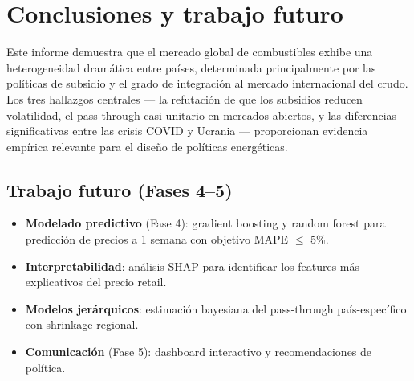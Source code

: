 \documentclass[stu, 12pt, a4paper, biblatex, donotrepeattitle]{apa7}
\begin{document}
\section{Conclusiones y trabajo futuro}

Este informe demuestra que el mercado global de combustibles exhibe una heterogeneidad dramática entre países, determinada principalmente por las políticas de subsidio y el grado de integración al mercado internacional del crudo. Los tres hallazgos centrales --- la refutación de que los subsidios reducen volatilidad, el pass-through casi unitario en mercados abiertos, y las diferencias significativas entre las crisis COVID y Ucrania --- proporcionan evidencia empírica relevante para el diseño de políticas energéticas.

\subsection{Trabajo futuro (Fases 4--5)}

\begin{itemize}
  \item \textbf{Modelado predictivo} (Fase 4): gradient boosting y random forest para predicción de precios a 1 semana con objetivo MAPE $\leq$ 5\%.
  \item \textbf{Interpretabilidad}: análisis SHAP para identificar los features más explicativos del precio retail.
  \item \textbf{Modelos jerárquicos}: estimación bayesiana del pass-through país-específico con shrinkage regional.
  \item \textbf{Comunicación} (Fase 5): dashboard interactivo y recomendaciones de política.
\end{itemize}

\printbibliography
\end{document}
